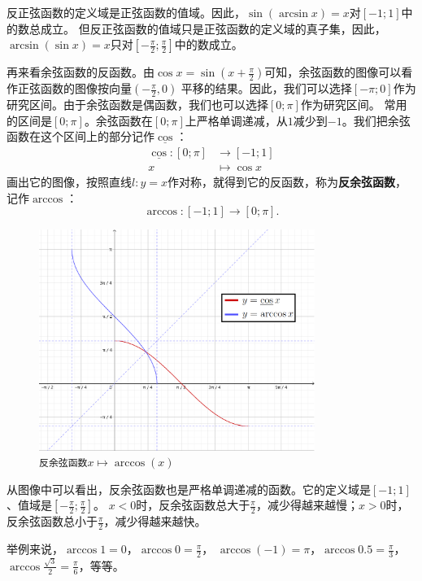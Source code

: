 \documentclass[12pt,UTF8]{ctexbook}
\begin{document}
反正弦函数的定义域是正弦函数的值域。因此，$\sin{(\arcsin{x})} = x$对$[-1; 1]$中的数总成立。
但反正弦函数的值域只是正弦函数的定义域的真子集，因此，$\arcsin{(\sin{x})} = x$只对$[-\frac{\pi}{2}; \frac{\pi}{2}]$中的数成立。

再来看余弦函数的反函数。由$\cos{x} = \sin(x+\frac{\pi}{2})$可知，余弦函数的图像可以看作正弦函数的图像按向量$\left(-\frac{\pi}{2}, 0\right)$
平移的结果。因此，我们可以选择$[-\pi; 0]$作为研究区间。由于余弦函数是偶函数，我们也可以选择$[0;\pi]$作为研究区间。
常用的区间是$[0;\pi]$。余弦函数在$[0;\pi]$上严格单调递减，从$1$减少到$-1$。我们把余弦函数在这个区间上的部分记作$\underline{\cos}$：
\begin{align*}
    \underline{\cos} : [0;\pi] &\rightarrow [-1; 1] \\                                  x &\mapsto \cos{x} 
\end{align*}
画出它的图像，按照直线$l: y = x$作对称，就得到它的反函数，称为\textbf{反余弦函数}，记作$\arccos$：
$$ \arccos : [-1; 1] \rightarrow [0;\pi] . $$

\begin{figure}[h] %
    \vspace{4pt}
    \centering
    \includegraphics[width=0.8\textwidth]{tu/反余弦函数1.png}
    \caption*{\texttt{反余弦函数}$x\mapsto \arccos(x)$}
\end{figure}

从图像中可以看出，反余弦函数也是严格单调递减的函数。它的定义域是$[-1; 1]$、值域是$[-\frac{\pi}{2}; \frac{\pi}{2}]$。
$x < 0$时，反余弦函数总大于$\frac{\pi}{2}$，减少得越来越慢；$x > 0$时，反余弦函数总小于$\frac{\pi}{2}$，减少得越来越快。

举例来说，$\arccos{1} = 0$，$\arccos{0} = \frac{\pi}{2}$，
$\arccos{(-1)} = \pi$，$\arccos{0.5} = \frac{\pi}{3}$，$\arccos{\frac{\sqrt{3}}{2}} = \frac{\pi}{6}$，等等。
\end{document}
